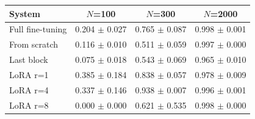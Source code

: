 \begin{tabular}{lccc}
\toprule
System & $N$=100 & $N$=300 & $N$=2000 \\
\midrule
Full fine-tuning & 0.204 $\pm$ 0.027 & 0.765 $\pm$ 0.087 & 0.998 $\pm$ 0.001 \\
From scratch & 0.116 $\pm$ 0.010 & 0.511 $\pm$ 0.059 & 0.997 $\pm$ 0.000 \\
Last block & 0.075 $\pm$ 0.018 & 0.543 $\pm$ 0.069 & 0.965 $\pm$ 0.010 \\
LoRA r=1 & 0.385 $\pm$ 0.184 & 0.838 $\pm$ 0.057 & 0.978 $\pm$ 0.009 \\
LoRA r=4 & 0.337 $\pm$ 0.146 & 0.938 $\pm$ 0.007 & 0.996 $\pm$ 0.001 \\
LoRA r=8 & 0.000 $\pm$ 0.000 & 0.621 $\pm$ 0.535 & 0.998 $\pm$ 0.000 \\
\bottomrule
\end{tabular}
